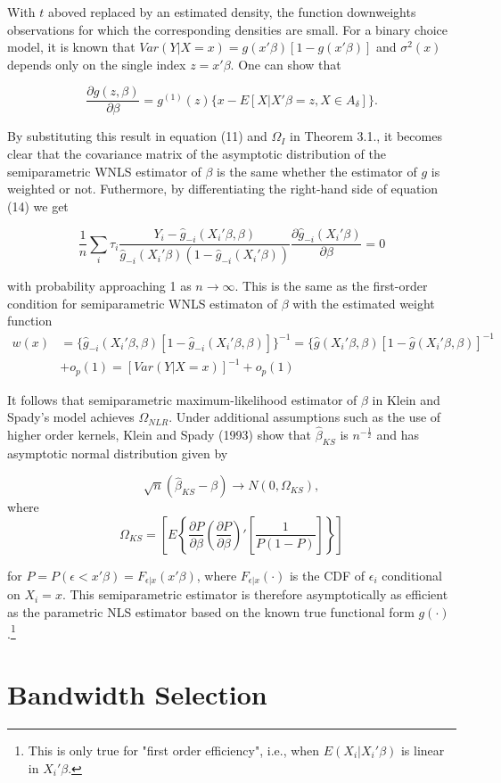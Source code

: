\documentclass[a4paper]{article}
\begin{document}
With $t$ aboved replaced by an estimated density, the function downweights observations for which the corresponding densities are small.
For a binary choice model, it is known that $Var(Y|X = x) = g(x'\beta)[1 - g(x'\beta)]$ and $\sigma^2(x)$ depends only on the single index $z = x'\beta$. One can show that %

\[ \frac{\partial g(z,\beta)}{\partial \beta} = g^{(1)}(z)\{x - E[X|X'\beta = z, X \in A_{\delta}]\}.\]

By substituting this result in equation (11) and $\Omega_I$ in Theorem 3.1., it becomes clear that the covariance matrix of the asymptotic distribution of the semiparametric WNLS estimator of $\beta$ is the same whether the estimator of $g$ is weighted or not. Futhermore, by differentiating the right-hand side of equation (14) we get 

\[ \frac{1}{n} \sum_i \tau_{i} \frac{Y_i - \hat{g}_{-i}(X_i'\beta, \beta)}{\hat{g}_{-i}(X_i'\beta)(1 - \hat{g}_{-i}(X_i'\beta))} \frac{\partial\hat{g}_{-i}(X_i'\beta)}{\partial \beta} = 0 \]

with probability approaching 1 as $n \rightarrow \infty$. This is the same as the first-order condition for semiparametric WNLS estimaton of $\beta$ with the estimated weight function
\begin{align*}
w(x) & = \{ \hat{g}_{-i}(X_i'\beta, \beta)[ 1 - \hat{g}_{-i}(X_i'\beta, \beta)]\}^{-1} = \{ \hat{g}(X_i'\beta, \beta)[ 1 - \hat{g}(X_i'\beta, \beta)]^{-1} \\
	 & + o_p(1) = [Var(Y|X = x)]^{-1} + o_p(1)
\end{align*}

It follows that semiparametric maximum-likelihood estimator of $\beta$ in Klein and Spady's model achieves $\Omega_{NLR}$. 
Under additional assumptions such as the use of higher order kernels, Klein and Spady (1993) show that $\hat{\beta}_{KS}$ is $n^{-\frac{1}{2}}$ and has asymptotic normal distribution given by

\begin{equation}
\sqrt{n}(\hat{\beta}_{KS} - \beta) \rightarrow N(0,\Omega_{KS}),
\end{equation}
where \[ \Omega_{KS} = \left[ E \left\{ \frac{\partial P}{\partial \beta}\left(\frac{\partial P}{\partial \beta}\right)'\left[\frac{1}{P(1 - P)}\right]\right\}\right] \]

for $ P = P( \epsilon < x'\beta) = F_{\epsilon|x}(x'\beta)$, where $F_{\epsilon|x}(\cdot)$ is the CDF of $\epsilon_i$ conditional on $X_i = x$. This semiparametric estimator is therefore asymptotically as efficient as the parametric NLS estimator based on the known true functional form $g(\cdot)$.\footnote{This is only true for "first order efficiency", i.e., when $E(X_i|X_i'\beta)$ is linear in $X_i'\beta$.}

\section{Bandwidth Selection} %
\label{sec:Bandwidth Selection}


\newpage 


\end{document}
